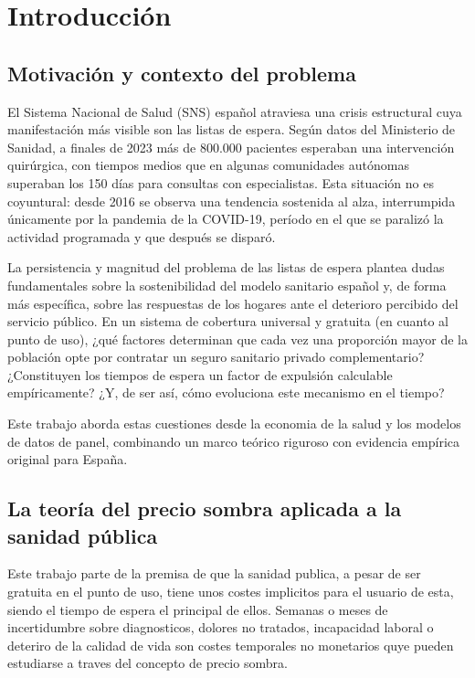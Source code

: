\chapter{Introducción}
\label{cap:introduccion}

\section{Motivación y contexto del problema}

El Sistema Nacional de Salud (SNS) español atraviesa una crisis estructural cuya
manifestación más visible son las listas de espera. Según datos del
Ministerio de Sanidad, a finales de 2023 más de 800.000 pacientes esperaban una
intervención quirúrgica, con tiempos medios que en algunas comunidades autónomas
superaban los 150 días para consultas con especialistas. Esta situación no es
coyuntural: desde 2016 se observa una tendencia sostenida al alza, interrumpida
únicamente por la pandemia de la COVID-19, período en el que se paralizó la 
actividad programada y que después se disparó.

La persistencia y magnitud del problema de las listas de espera plantea
dudas fundamentales sobre la sostenibilidad del modelo sanitario español
y, de forma más específica, sobre las respuestas de los hogares ante el 
deterioro percibido del servicio público. En un sistema de 
cobertura universal y gratuita (en cuanto al punto de uso), ¿qué factores determinan que
cada vez una proporción mayor de la población opte por contratar un seguro sanitario
privado complementario? ¿Constituyen los tiempos de espera un factor de expulsión
 calculable empíricamente? ¿Y, de ser así, cómo evoluciona este mecanismo en el tiempo?

Este trabajo aborda estas cuestiones desde la economia de la salud y los 
modelos de datos de panel, combinando un marco teórico riguroso con
evidencia empírica original para España.

\section{La teoría del precio sombra aplicada a la sanidad pública}
Este trabajo parte de la premisa de que la sanidad publica, a pesar de ser gratuita en el punto de uso,
tiene unos costes implicitos para el usuario de esta, siendo el tiempo de espera el principal de ellos.
Semanas o meses de incertidumbre sobre diagnosticos, dolores no tratados, incapacidad laboral o deteriro de la 
calidad de vida son costes temporales no monetarios quye pueden estudiarse a traves del concepto de precio sombra.

